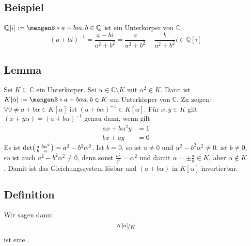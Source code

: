 \subsection[{Beispiel: $\mathds{Q}[i]$ ist Unterkörper von $\mathds{C}$}]{Beispiel} %
\label{sub:108}
$\mathds{Q}[i] := \set[a+ b i]{a,b \in \mathds{Q}} $ ist ein Unterkörper von $\mathds{C}$
\[
	(a+bi)^{-1} = \frac{a-bi}{a^2 + b^2} = \frac{a}{a^2 +b^2}+ \frac{b}{a^2 + b^2} i \in \mathds{Q}[i]   
\]

\subsection[{Lemma: Wenn $K$ Unterkörper von $\mathds{C}$, dann ist $K[\alpha]$ auch Unterkörper von $\mathds{C}$}]{Lemma} %
\label{sub:109}
Sei $K \subseteq \mathds{C}$ ein Unterkörper. Sei $\alpha \in \mathds{C} \setminus K$ mit $\alpha^2 \in K$. Dann ist $K[\alpha] := \set[a+ b \alpha]{a,b \in K} $ ein
Unterkörper von $\mathds{C}$.
Zu zeigen: $\forall 0 \not= a + b \alpha \in K[\alpha]$ ist $(a+ b \alpha)^{-1} \in K[\alpha]$. Für $x,y \in K$ gilt $(x+y \alpha) = (a+ b \alpha) ^{-1}$ genau dann, wenn
gilt 
\begin{align*}
	ax + b \alpha^2 y &= 1 \\
	 bx + ay &= 0
\end{align*}
Es ist $\det \begin{psmallmatrix}
	a	& b \alpha^2 \\
	b & a
\end{psmallmatrix}= a^2 - b^2 \alpha^2$. Ist $b=0$, so ist $a\not=0$
und $\alpha^2 - b^2 \alpha^2 \not= 0$. ist $b \not= 0$, so ist auch $a^2 - b^2	\alpha^2 \not= 0$, denn sonst $\frac{a^2}{b^2} = \alpha^2 $ und damit 
$\alpha = \pm \frac{a}{b} \in K$, aber $\alpha \not\in K$.  
Damit ist das Gleichungssystem lösbar und $(a+ b \alpha)$ in $K[\alpha]$ invertierbar. \bewende

\subsection[Definition: Quadratische Körpererweiterung]{Definition} %
\label{sub:1010}
Wir sagen dann: 
\[
	\nicefrac{K[\alpha]}{K} 
\]
ist eine .

